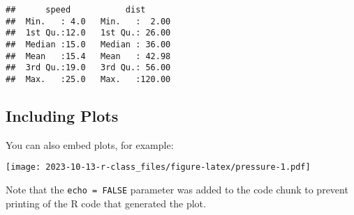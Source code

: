 \documentclass[
]{article}
\begin{document}
\begin{verbatim}
##      speed           dist       
##  Min.   : 4.0   Min.   :  2.00  
##  1st Qu.:12.0   1st Qu.: 26.00  
##  Median :15.0   Median : 36.00  
##  Mean   :15.4   Mean   : 42.98  
##  3rd Qu.:19.0   3rd Qu.: 56.00  
##  Max.   :25.0   Max.   :120.00
\end{verbatim}

\hypertarget{including-plots}{%
\subsection{Including Plots}\label{including-plots}}

You can also embed plots, for example:

\texttt{[image: 2023-10-13-r-class\_files/figure-latex/pressure-1.pdf]}

Note that the \texttt{echo\ =\ FALSE} parameter was added to the code
chunk to prevent printing of the R code that generated the plot.
\end{document}

